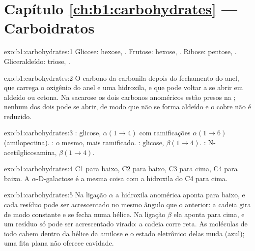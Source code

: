 \section*{Capítulo \ref{ch:b1:carbohydrates} --- Carboidratos}

\begin{solution}{exo:b1:carbohydrates:1}
Glicose: hexose, . Frutose: hexose, . Ribose: pentose,
. Gliceraldeído: triose, .
\end{solution}

\begin{solution}{exo:b1:carbohydrates:2}
O carbono da carbonila depois do fechamento do anel, que carrega o
oxigênio do anel e uma hidroxila, e que pode voltar a se abrir em
aldeído ou cetona. Na sacarose os dois carbonos anoméricos estão presos
na ; nenhum dos dois pode se abrir, de modo que não
se forma aldeído e o cobre não é reduzido.
\end{solution}

\begin{solution}{exo:b1:carbohydrates:3}
: glicose, $\alpha(1{\to}4)$ com ramificações $\alpha(1{\to}6)$
(amilopectina). : o mesmo, mais ramificado. : glicose,
$\beta(1{\to}4)$. : N-acetilglicosamina, $\beta(1{\to}4)$.
\end{solution}

\begin{solution}{exo:b1:carbohydrates:4}
C1 para baixo, C2 para baixo, C3 para cima, C4 para baixo. A
$\alpha$-D-galactose é a mesma coisa com a hidroxila do C4 para cima.
\end{solution}

\begin{solution}{exo:b1:carbohydrates:5}
Na ligação $\alpha$ a hidroxila anomérica aponta para baixo, e cada
resíduo pode ser acrescentado no mesmo ângulo que o anterior: a cadeia
gira de modo constante e se fecha numa hélice. Na ligação $\beta$ ela
aponta para cima, e um resíduo só pode ser acrescentado virado: a cadeia
corre reta. As moléculas de iodo cabem dentro da hélice da amilose e o
estado eletrônico delas muda (azul); uma fita plana não oferece
cavidade.
\end{solution}

